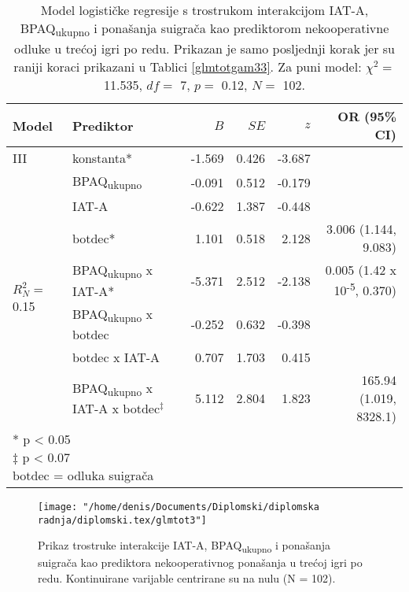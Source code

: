 \documentclass[a4paper, 12pt]{report}
\begin{document}
\begin{appendices}
\begin{table}
    \begin{center}
        \caption{\label{glmtotgam3} Model logističke regresije s trostrukom interakcijom IAT-A,
            BPAQ\textsubscript{ukupno} i ponašanja suigrača kao prediktorom
            nekooperativne odluke u trećoj igri po redu. Prikazan je samo posljednji korak
            jer su raniji koraci prikazani u Tablici \ref{glmtotgam33}. Za puni
            model: $\chi^2 =$
            11.535, $df =$ 7, $p =$ 0.12, $N =$ 102.}
        \hspace*{-0.5cm}\begin{tabular}{llrrrr}
        \toprule
        Model & Prediktor & $B$ & $SE$ & $z$ & OR (95\% CI)\\
        \midrule
        III & konstanta* & -1.569 & 0.426 & -3.687 &\\
        \multirow{7}{*}{$R^2_N =$ 0.15}
        &BPAQ\textsubscript{ukupno} & -0.091 & 0.512 & -0.179 & \\
        &IAT-A & -0.622 & 1.387 & -0.448 &\\
        &botdec* & 1.101 & 0.518 & 2.128 & 3.006 (1.144, 9.083)\\
        &BPAQ\textsubscript{ukupno} x IAT-A* & -5.371 & 2.512 & -2.138 & 0.005
        (1.42 x 10\textsuperscript{-5}, 0.370) \\
        &BPAQ\textsubscript{ukupno} x botdec & -0.252 & 0.632 & -0.398 &\\
        &botdec x IAT-A & 0.707 & 1.703 & 0.415 &\\
        & BPAQ\textsubscript{ukupno} x IAT-A x botdec$^\ddagger$ & 5.112 & 2.804
        & 1.823 & 165.94 (1.019, 8328.1) \\
        \bottomrule
        \multicolumn{5}{l}{
            \parbox{3cm}{\scriptsize \vspace{3pt} 
                * p < 0.05\\
                $\ddagger$  p < 0.07\\
                botdec = odluka suigrača
        }}
    \end{tabular}
\end{center}
\end{table}

\begin{figure}
    \begin{center}
        \caption{\label{glmtotgam3plot} Prikaz trostruke interakcije IAT-A,
            BPAQ\textsubscript{ukupno} i ponašanja suigrača kao prediktora
            nekooperativnog ponašanja u trećoj igri po redu. Kontinuirane
            varijable centrirane su na nulu (N = 102).}
        \texttt{[image: "/home/denis/Documents/Diplomski/diplomska
            radnja/diplomski.tex/glmtot3"]}
    \end{center}
\end{figure}


\end{appendices}
\end{document}
